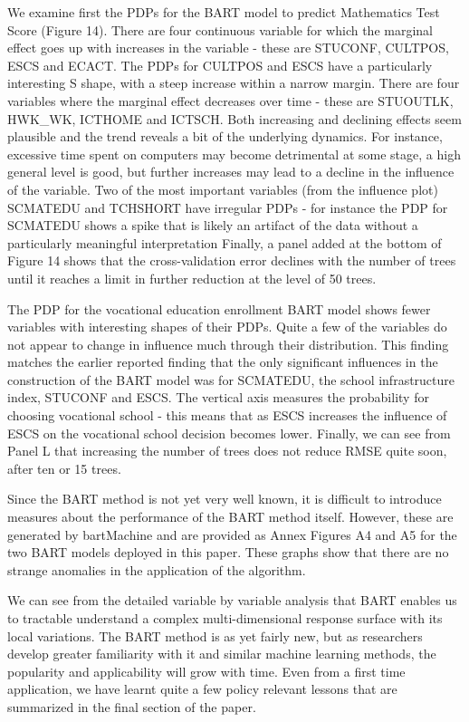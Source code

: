 \documentclass[alpha-refs,fleqn]{wiley-article_p2}
\begin{document}
We examine first the PDPs for the BART model to predict Mathematics Test Score (Figure 14). There are four continuous variable for which the marginal effect  goes up with increases in the variable - these are STUCONF, CULTPOS, ESCS and ECACT. The PDPs  for CULTPOS and ESCS have a particularly interesting S shape, with a steep increase within a narrow margin. There are four variables where the marginal effect decreases over time - these are STUOUTLK, HWK\_WK, ICTHOME and ICTSCH. Both increasing and declining effects seem plausible and the trend reveals a bit of the underlying dynamics. For instance, excessive time spent on computers may become detrimental at some stage, a high general level is good, but further increases may lead to a decline in the influence of the variable. Two of the most important variables (from the influence plot) SCMATEDU and TCHSHORT have irregular PDPs - for instance the PDP for SCMATEDU shows a spike that is likely an artifact of the data without a particularly meaningful interpretation Finally, a panel added at the bottom of Figure 14 shows that the cross-validation error declines with the number of trees until it reaches a limit in further reduction at the level of 50 trees. 

The PDP for the vocational education enrollment BART model shows fewer variables with interesting shapes of their PDPs. Quite a few of the variables do not appear to change in influence much through their distribution. This finding matches the earlier reported finding that the only significant influences in the construction of the BART model was for SCMATEDU, the school infrastructure index, STUCONF and ESCS. The vertical axis measures the probability for choosing vocational school - this means that as ESCS increases the influence of ESCS on the vocational school decision becomes lower. Finally, we can see from Panel L that increasing the number of trees does not reduce RMSE quite soon, after ten or 15 trees. 

Since the BART method is not yet very well known, it is difficult to introduce measures about the performance of the BART method itself. However, these are generated by bartMachine and are provided as Annex Figures A4 and A5 for the two BART models deployed in this paper. These graphs show that there are no strange anomalies in the application of the algorithm. 

We can see from the detailed variable by variable analysis that BART enables us to tractable understand a complex multi-dimensional response surface with its local variations. The BART method is as yet fairly new, but as researchers develop greater familiarity with it and similar machine learning methods, the popularity and applicability will grow with time. Even from a first time application, we have learnt quite a few policy relevant lessons that are summarized in the final section of the paper.
\end{document}
